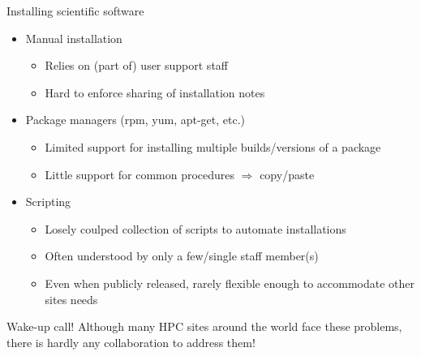 \documentclass[10pt,xcolor={usenames,dvipsnames}]{beamer}
\begin{document}
\begin{frame}{Installing scientific software}
\begin{itemize}
    \item
        Manual installation
        \begin{itemize}
            \item
                Relies on (part of) user support staff
            \item
                Hard to enforce sharing of installation notes
        \end{itemize}
    \item
        Package managers (rpm, yum, apt-get, etc.)
        \begin{itemize}
            \item
                Limited support for installing multiple builds/versions of a
                package
            \item
                Little support for common procedures $\Rightarrow$ copy/paste
        \end{itemize}
    \item
        Scripting
        \begin{itemize}
            \item
                Losely coulped collection of scripts to automate installations
            \item
                Often understood by only a few/single staff member(s)
            \item
                Even when publicly released, rarely flexible enough to
                accommodate other sites needs
        \end{itemize}
\end{itemize}
\begin{center}
    \begin{minipage}{0.9\textwidth}
        \begin{alertblock}{Wake-up call!}
            \footnotesize
            Although many HPC sites around the world face these problems,
            there is hardly any collaboration to address them!
        \end{alertblock}
    \end{minipage}
\end{center}
\end{frame}

\end{document}
